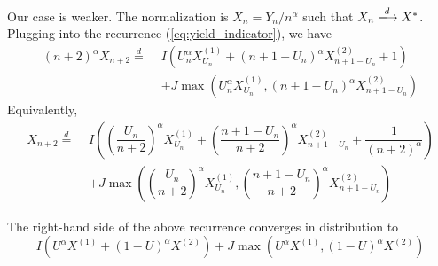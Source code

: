 Our case is weaker. The normalization is $X_n = Y_n / n^{\alpha}$ such that $X_n\xlongrightarrow{d}X^*$. Plugging into the recurrence (\ref{eq:yield_indicator}), we have
\begin{align*}
  (n+2)^\alpha X_{n+2} \stackrel{d}{=} \,\,
   & I\left(U_n^\alpha X_{U_n}^{(1)} + (n+1-U_n)^\alpha X_{n+1-U_n}^{(2)} + 1\right)  \\
   & + J\max\left(U_n^\alpha X_{U_n}^{(1)}, (n+1-U_n)^\alpha X_{n+1-U_n}^{(2)}\right)
\end{align*}
Equivalently,
\begin{equation}
  \begin{aligned}
    X_{n+2} \stackrel{d}{=}\,\,
     & I\left(\left(\dfrac{U_n}{n+2}\right)^\alpha X_{U_n}^{(1)} + \left(\dfrac{n+1-U_n}{n+2}\right)^\alpha X_{n+1-U_n}^{(2)} + \dfrac{1}{(n+2)^\alpha}\right) \\
     & + J\max\left(\left(\dfrac{U_n}{n+2}\right)^\alpha X_{U_n}^{(1)}, \left(\dfrac{n+1-U_n}{n+2}\right)^\alpha X_{n+1-U_n}^{(2)}\right)
  \end{aligned}
\end{equation}

\begin{proposition}
  The right-hand side of the above recurrence converges in distribution to
  \begin{equation}
    I\left(U^\alpha X^{(1)} + (1-U)^\alpha X^{(2)}\right) + J\max\left(U^\alpha X^{(1)}, (1-U)^\alpha X^{(2)}\right)
  \end{equation}
\end{proposition}

